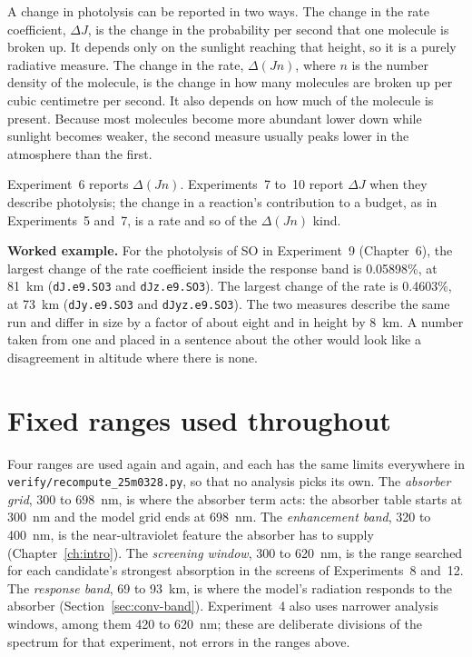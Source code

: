 A change in photolysis can be reported in two ways. The change in the rate
coefficient, $\Delta J$, is the change in the probability per second that one molecule is
broken up. It depends only on the sunlight reaching that height, so it is a purely
radiative measure. The change in the rate, $\Delta(J n)$, where $n$ is the number
density of the molecule, is the change in how many molecules are broken up per cubic
centimetre per second. It also depends on how much of the molecule is present. Because
most molecules become more abundant lower down while sunlight becomes weaker, the
second measure usually peaks lower in the atmosphere than the first.

Experiment~6 reports $\Delta(J n)$. Experiments~7 to~10 report $\Delta J$ when they
describe photolysis; the change in a reaction's contribution to a budget, as in
Experiments~5 and~7, is a rate and so of the $\Delta(J n)$ kind.

\textbf{Worked example.} For the photolysis of SO in Experiment~9 (Chapter~6),
the largest change of the rate coefficient inside the response band is 0.05898\%, at
81~km (\texttt{dJ.e9.SO3} and \texttt{dJz.e9.SO3}). The largest change of the rate is
0.4603\%, at 73~km (\texttt{dJy.e9.SO3} and \texttt{dJyz.e9.SO3}). The two measures
describe the same run and differ in size by a factor of about eight and in height by
8~km. A number taken from one and placed in a sentence about the other would look like
a disagreement in altitude where there is none.

\section{Fixed ranges used throughout}
\label{sec:conv-windows}

Four ranges are used again and again, and each has the same limits everywhere in
\texttt{verify/recompute\_25m0328.py}, so that no analysis picks its own. The
\emph{absorber grid}, 300 to 698~nm, is where the absorber term acts: the absorber table
starts at 300~nm and the model grid ends at 698~nm. The \emph{enhancement band}, 320 to
400~nm, is the near-ultraviolet feature the absorber has to supply
(Chapter~\ref{ch:intro}). The \emph{screening window}, 300 to 620~nm, is the range
searched for each candidate's strongest absorption in the screens of Experiments~8
and~12. The \emph{response band}, 69 to 93~km, is where the model's radiation responds to
the absorber (Section~\ref{sec:conv-band}). Experiment~4 also uses narrower analysis
windows, among them 420 to 620~nm; these are deliberate divisions of the spectrum for
that experiment, not errors in the ranges above.


